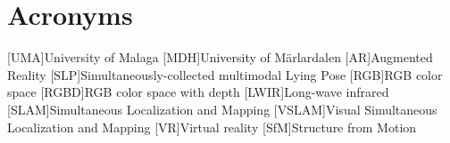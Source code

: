 \section*{Acronyms}
\begin{acronym}[MPC] %
    [UMA]{University of Malaga}
    [MDH]{University of Märlardalen}
    [AR]{Augmented Reality}
    [SLP]{Simultaneously-collected multimodal Lying Pose}
    [RGB]{RGB color space}
    [RGBD]{RGB color space with depth}
    [LWIR]{Long-wave infrared}
    [SLAM]{Simultaneous Localization and Mapping}
    [VSLAM]{Visual Simultaneous Localization and Mapping}
    [VR]{Virtual reality}
    [SfM]{Structure from Motion}
\end{acronym}

\newpage
